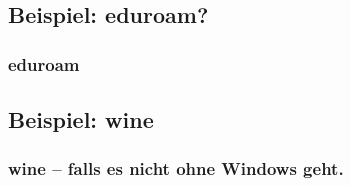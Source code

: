 \documentclass{beamer}
\begin{document}
        \subsection{Beispiel: eduroam?}
            \begin{frame}
          		\frametitle{eduroam}
        		\begin{minipage}{0.44\textwidth}
        		
        		\end{minipage}%
        		\begin{minipage}{0.54\textwidth}
        		
        		\end{minipage}
        	\end{frame}
        	
        \subsection{Beispiel: wine}
            \begin{frame}
          		\frametitle{wine -- falls es nicht ohne Windows geht.}
        		\begin{minipage}{0.44\textwidth}
        		
        		\end{minipage}%
        		\begin{minipage}{0.54\textwidth}
        		
        		\end{minipage}
        	\end{frame}
        	
\end{document}
